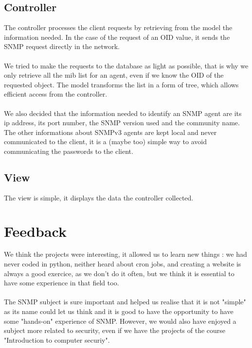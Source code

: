 \documentclass[a4paper,titlepage]{article}
\begin{document}
\subsection{Controller}
The controller processes the client requests by retrieving from the model the information needed. In the case of the request of an OID value, it sends the SNMP request directly in the network.

\paragraph{}

We tried to make the requests to the database as light as possible, that is why we only retrieve all the mib list for an agent, even if we know the OID of the requested object. The model transforms the list in a form of tree, which allows efficient access from the controller.

\paragraph{}

We also decided that the information needed to identify an SNMP agent are its ip address, its port number, the SNMP version used and the community name. The other informations about SNMPv3 agents are kept local and never communicated to the client, it is a (maybe too) simple way to avoid communicating the passwords to the client. 


\subsection{View}
The view is simple, it displays the data the controller collected. 



\section{Feedback} 
We think the projects were interesting, it allowed us to learn new things : we had never coded in python, neither heard about cron jobs, and creating a website is always a good exercice, as we don't do it often, but we think it is essential to have some experience in that field too.

\paragraph{}

The SNMP subject is sure important and helped us realise that it is not "simple" as its name could let us think and it is good to have the opportunity to have some "hands-on" experience of SNMP. However, we would also have enjoyed a subject more related to security, even if we have the projects of the course "Introduction to computer securiy".
\end{document}
